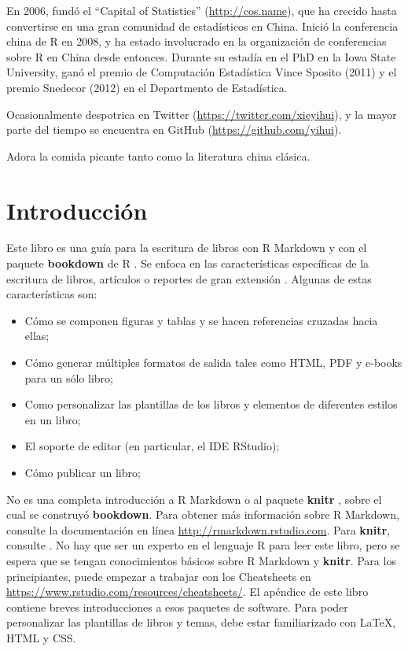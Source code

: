 \documentclass[12pt,]{krantz}
\theoremstyle{definition}
\theoremstyle{definition}
\theoremstyle{remark}
\begin{document}
En 2006, fundó el ``Capital of Statistics'' (\url{http://cos.name}), que
ha crecido hasta convertirse en una gran comunidad de estadísticos en
China. Inició la conferencia china de R en 2008, y ha estado involucrado
en la organización de conferencias sobre R en China desde entonces.
Durante su estadía en el PhD en la Iowa State University, ganó el premio
de Computación Estadística Vince Sposito (2011) y el premio Snedecor
(2012) en el Departmento de Estadística.

Ocasionalmente despotrica en Twitter
(\url{https://twitter.com/xieyihui}), y la mayor parte del tiempo se
encuentra en GitHub (\url{https://github.com/yihui}).

Adora la comida picante tanto como la literatura china clásica.

\mainmatter

\chapter{Introducción}\label{introduccion}

Este libro es una guía para la escritura de libros con R Markdown
\citep{R-rmarkdown} y con el paquete \textbf{bookdown} de R
\citep{R-bookdown}. Se enfoca en las características específicas de la
escritura de libros, artículos o reportes de gran extensión . Algunas de
estas características son:

\begin{itemize}
\item
  Cómo se componen figuras y tablas y se hacen referencias cruzadas
  hacia ellas;
\item
  Cómo generar múltiples formatos de salida tales como HTML, PDF y
  e-books para un sólo libro;
\item
  Como personalizar las plantillas de los libros y elementos de
  diferentes estilos en un libro;
\item
  El soporte de editor (en particular, el IDE RStudio);
\item
  Cómo publicar un libro;
\end{itemize}

No es una completa introducción a R Markdown o al paquete \textbf{knitr}
\citep{R-knitr}, sobre el cual se construyó \textbf{bookdown}. Para
obtener más información sobre R Markdown, consulte la documentación en
línea \url{http://rmarkdown.rstudio.com}. Para \textbf{knitr}, consulte
\citet{xie2015}. No hay que ser un experto en el lenguaje R
\citep{R-base} para leer este libro, pero se espera que se tengan
conocimientos básicos sobre R Markdown y \textbf{knitr}. Para los
principiantes, puede empezar a trabajar con los Cheatsheets en
\url{https://www.rstudio.com/resources/cheatsheets/}. El apéndice de
este libro contiene breves introducciones a esos paquetes de software.
Para poder personalizar las plantillas de libros y temas, debe estar
familiarizado con LaTeX, HTML y CSS.
\end{document}
